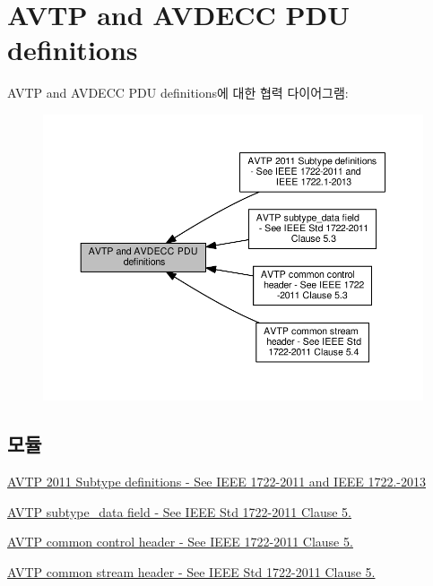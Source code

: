 \hypertarget{group__pdu}{}\section{A\+V\+TP and A\+V\+D\+E\+CC P\+DU definitions}
\label{group__pdu}
A\+V\+TP and A\+V\+D\+E\+CC P\+DU definitions에 대한 협력 다이어그램\+:
\nopagebreak
\begin{figure}[H]
\begin{center}
\leavevmode
\includegraphics[width=350pt]{group__pdu}
\end{center}
\end{figure}
\subsection*{모듈}
\begin{DoxyCompactItemize}
\item 
\hyperlink{group__subtype}{A\+V\+T\+P 2011 Subtype definitions -\/ See I\+E\+E\+E 1722-\/2011 and I\+E\+E\+E 1722.-\/2013}
\item 
\hyperlink{group__jdksavdecc__subtype__data}{A\+V\+T\+P subtype\+\_\+data field -\/ See I\+E\+E\+E Std 1722-\/2011 Clause 5.}
\item 
\hyperlink{group__jdksavdecc__avtp__common__control__header}{A\+V\+T\+P common control header -\/ See I\+E\+E\+E 1722-\/2011 Clause 5.}
\item 
\hyperlink{group__jdksavdecc__avtp__common__stream__header}{A\+V\+T\+P common stream header -\/ See I\+E\+E\+E Std 1722-\/2011 Clause 5.}
\end{DoxyCompactItemize}
